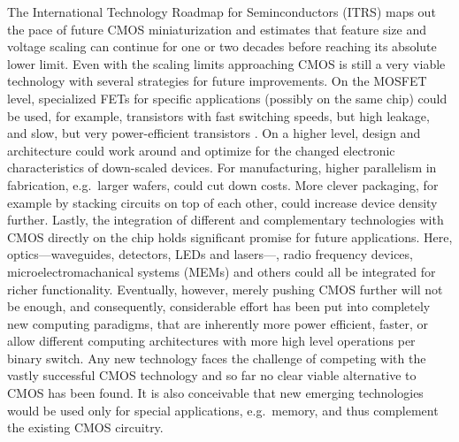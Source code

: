 The International Technology Roadmap for Seminconductors (ITRS) \cite{itrs2011} maps out the
pace of future CMOS miniaturization and estimates that feature size and voltage
scaling can continue for one or two decades before reaching its absolute lower
limit. Even with the scaling limits approaching CMOS is still a very viable
technology with several strategies for future improvements. On the MOSFET level,
specialized FETs for specific applications (possibly on the same chip) could be
used, for example, transistors with fast switching speeds, but high leakage, and
slow, but very power-efficient transistors \cite{cavin2012science}. On a higher level, design and
architecture could work around and optimize for the changed electronic
characteristics of down-scaled devices. For manufacturing, higher parallelism in
fabrication, e.g.~larger wafers, could cut down costs. More clever packaging,
for example by stacking circuits on top of each other, could increase device
density further. Lastly, the integration of different and complementary
technologies with CMOS directly on the chip holds significant promise for future
applications. Here, optics---waveguides, detectors, LEDs and lasers---, radio
frequency devices, microelectromachanical systems (MEMs) and others could all be
integrated for richer functionality. Eventually, however, merely pushing CMOS
further will not be enough, and consequently, considerable effort has been put
into completely new computing paradigms, that are inherently more power
efficient, faster, or allow different computing architectures with more high
level operations per binary switch. Any new technology faces the challenge of
competing with the vastly successful CMOS technology and so far no clear viable
alternative to CMOS has been found. It is also conceivable that new emerging
technologies would be used only for special applications, e.g.~memory, and thus
complement the existing CMOS circuitry.





